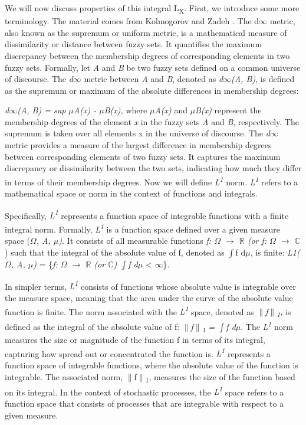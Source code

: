 \documentclass[12pt,a4paper]{report}
\numberwithin{equation}{section}
\begin{document}
We will now discuss properties of this integral L\textsubscript{X}.
First, we introduce some more terminology. The material comes from
Kolmogorov \cite{kolmogorov1957elements_84} and Zadeh \cite{zadeh1965fuzzy_66}. The d$\infty$ metric, also known as the
supremum or uniform metric, is a mathematical measure of dissimilarity
or distance between fuzzy sets. It quantifies the maximum discrepancy
between the membership degrees of corresponding elements in two fuzzy
sets. Formally, let \emph{A} and \emph{B} be two fuzzy sets defined on a
common universe of discourse. The \emph{d$\infty$} metric between \emph{A} and
\emph{B}, denoted as \emph{d$\infty$(A, B)}, is defined as the supremum or
maximum of the absolute differences in membership degrees:

\emph{d$\infty$(A, B) = sup \textbar $\mu$A(x) - $\mu$B(x)\textbar,} where \emph{$\mu$A(x)}
and \emph{$\mu$B(x)} represent the membership degrees of the element
\emph{x} in the fuzzy sets \emph{A} and \emph{B}, respectively. The
supremum is taken over all elements x in the universe of discourse. The
\emph{d$\infty$} metric provides a measure of the largest difference in
membership degrees between corresponding elements of two fuzzy sets. It
captures the maximum discrepancy or dissimilarity between the two sets,
indicating how much they differ in terms of their membership degrees.
Now we will define \emph{L\textsuperscript{1}} norm. \emph{L\textsuperscript{1}} refers to a mathematical
space or norm in the context of functions and integrals.

Specifically, \emph{L\textsuperscript{1}} represents a function space of integrable
functions with a finite integral norm. Formally, \emph{L\textsuperscript{1}} is a function
space defined over a given measure space (\emph{$\Omega$, A, $\mu$).} It consists
of all measurable functions \emph{f: $\Omega$ $\rightarrow$ $\mathbb{R}$ (or f: $\Omega$ $\rightarrow$ $\mathbb{C}$}) such that the
integral of the absolute value of f, denoted as $\int$\textbar f\textbar{}
d$\mu$, is finite: \emph{L1($\Omega$, A, $\mu$)} = \{\emph{f: $\Omega$ $\rightarrow$ $\mathbb{R}$ (or $\mathbb{C}$) \textbar{}
$\int$\textbar f\textbar{} d$\mu$} \textless{} $\infty$\}.

In simpler terms, \emph{L\textsuperscript{1}} consists of functions whose absolute value is
integrable over the measure space, meaning that the area under the curve
of the absolute value function is finite. The norm associated with the
\emph{L\textsuperscript{1}} space, denoted as \emph{$\|$f$\|$\textsubscript{1},} is defined as the integral of
the absolute value of f: \emph{$\|$f$\|$\textsubscript{1} = $\int$\textbar f\textbar{} d$\mu$}. The
\emph{L\textsuperscript{1}} norm measures the size or magnitude of the function f in terms
of its integral, capturing how spread out or concentrated the function
is. \emph{L\textsuperscript{1}} represents a function space of integrable functions, where
the absolute value of the function is integrable. The associated norm,
$\|$f$\|$\textsubscript{1}, measures the size of the function based on its integral. In the
context of stochastic processes, the \emph{L\textsuperscript{1}} space
refers to a function space that consists of processes that are
integrable with respect to a given measure.
\end{document}
